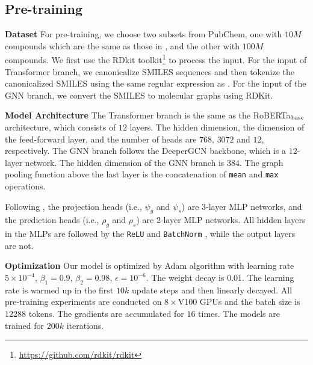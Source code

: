 \documentclass{article}
\begin{document}
\subsection{Pre-training}
\noindent\textbf{Dataset}
For pre-training, we choose two subsets from PubChem, one with $10M$ compounds which are the same as those in \cite{wang2021molclr,chithrananda2020chemberta}, and the other with $100M$ compounds. We first use the RDkit toolkit\footnote{\url{https://github.com/rdkit/rdkit}} to process the input. For the input of Transformer branch, we canonicalize SMILES sequences and then tokenize the canonicalized SMILES using the same regular expression as \cite{schwaller2019molecular}. For the input of the GNN branch, we convert the SMILES to molecular graphs using RDKit. 


\noindent\textbf{Model Architecture}
The Transformer branch is the same as the RoBERTa$_{\rm base}$ architecture, which consists of $12$  layers. The hidden dimension, the dimension of the feed-forward layer, and the number of heads are $768$, $3072$ and $12$, respectively. The GNN branch follows the DeeperGCN \citep{li2020deepergcn} backbone, which is a $12$-layer network. The hidden dimension of the GNN branch is $384$. The graph pooling function above the last layer is the concatenation of \texttt{mean} and \texttt{max} operations. 

Following \cite{chen2020simple, BYOL2020}, the projection heads (i.e., $\psi_g$ and $\psi_s$) are 3-layer MLP networks, and the prediction heads (i.e., $\rho_g$ and $\rho_s$) are 2-layer MLP networks. All hidden layers in the MLPs are followed by the \texttt{ReLU} and \texttt{BatchNorm} \citep{ioffe2015batch}, while the output layers are not. 


\noindent\textbf{Optimization}
Our model is optimized by Adam \citep{kingma2014adam} algorithm with learning rate $5\times10^{-4}$, $\beta_1=0.9$, $\beta_2=0.98$, $\epsilon=10^{-6}$. The weight decay is $0.01$. The learning rate is warmed up in the first $10k$ update steps and then linearly decayed. All pre-training experiments are conducted on $8\times$V100 GPUs and the batch size is $12288$ tokens. The  gradients are accumulated for $16$ times. The models are trained for $200k$ iterations. 
\end{document}
